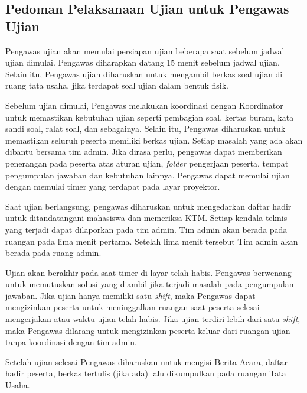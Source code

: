 \subsection{Pedoman Pelaksanaan Ujian untuk Pengawas Ujian}
    Pengawas ujian akan memulai persiapan ujian beberapa saat sebelum jadwal ujian
    dimulai. Pengawas diharapkan datang 15 menit sebelum jadwal ujian. Selain
    itu, Pengawas ujian diharuskan untuk mengambil berkas soal ujian di ruang
    tata usaha, jika terdapat soal ujian dalam bentuk fisik.

    Sebelum ujian dimulai, Pengawas melakukan koordinasi dengan Koordinator
    untuk memastikan kebutuhan ujian seperti pembagian soal, kertas buram, kata
    sandi soal, ralat soal, dan sebagainya. Selain itu, Pengawas diharuskan
    untuk memastikan seluruh peserta memiliki berkas ujian. Setiap masalah yang
    ada akan dibantu bersama tim admin. Jika dirasa perlu, pengawas dapat
    memberikan penerangan pada peserta atas aturan ujian, \textit{folder} pengerjaan
    peserta, tempat pengumpulan jawaban dan kebutuhan lainnya. Pengawas dapat
    memulai ujian dengan memulai timer yang terdapat pada layar proyektor.

    Saat ujian berlangsung, pengawas diharuskan untuk mengedarkan daftar hadir
    untuk ditandatangani mahasiswa dan memeriksa KTM. Setiap kendala teknis yang
    terjadi dapat dilaporkan pada tim admin. Tim admin akan berada pada ruangan
    pada lima menit pertama. Setelah lima menit tersebut Tim admin akan berada
    pada ruang admin. 
    
    Ujian akan berakhir pada saat timer di layar telah habis. Pengawas berwenang
    untuk memutuskan solusi yang diambil jika terjadi masalah pada pengumpulan
    jawaban. Jika ujian hanya memiliki satu \textit{shift}, maka Pengawas dapat
    mengizinkan peserta untuk meninggalkan ruangan saat peserta selesai
    mengerjakan atau waktu ujian telah habis. Jika ujian terdiri lebih dari satu
    \textit{shift}, maka Pengawas dilarang untuk mengizinkan peserta keluar dari
    ruangan ujian tanpa koordinasi dengan tim admin.

    Setelah ujian selesai Pengawas diharuskan untuk mengisi Berita Acara, daftar
    hadir peserta, berkas tertulis (jika ada) lalu dikumpulkan pada ruangan Tata
    Usaha.
    

